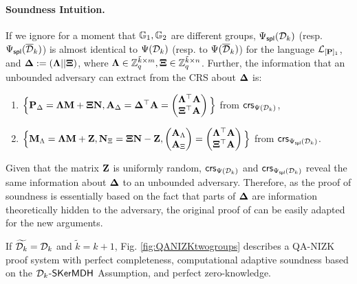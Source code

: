 \paragraph{Soundness Intuition.}   If we ignore for a moment that $\mathbb{G}_1, \mathbb{G}_2$ are different groups, ${\Psi_{\mathsf{spl}}(\mathcal{D}_k)}$ (resp. ${\Psi_\mathsf{spl}(\overline{\mathcal{D}}_k)}$) is almost identical to $\Psi({\mathcal{D}_k})$ (resp. to ${\Psi(\overline{\mathcal{D}}_k)}$) for the language $\mathcal{L}_{[\mathbf{{P}}]_1}$, and $\mathbf{{\Delta}}:=(\mathbf{{\Lambda}}||\mathbf{{\Xi}})$, where  $\mathbf{{\Lambda}} \in \mathbb{Z}_q^{\tilde{k} \times m},\mathbf{{\Xi}} \in \mathbb{Z}_q^{\tilde{k} \times n}$. Further, the information that an unbounded adversary can extract from the CRS about $\mathbf{{\Delta}}$ is:
 \begin{enumerate}
 \item $\Big\{\mathbf{{P}}_\Delta= \mathbf{{\Lambda}} \mathbf{{M}}+ \mathbf{{\Xi}}\mathbf{{N}}, \mathbf{{A}}_{\Delta} = \mathbf{{\Delta}}^{\top}\mathbf{{A}} =\begin{pmatrix} \mathbf{{\Lambda}}^{\top}\mathbf{{A}} \\ \mathbf{{\Xi}}^{\top}\mathbf{{A}} \end{pmatrix}\Big\}$ from $\mathsf{crs}_{\Psi({\mathcal{D}_k})}$, 
 \item $\Big\{ \mathbf{{M}}_\Lambda = \mathbf{{\Lambda}} \mathbf{{M}}+\mathbf{{Z}}, \mathbf{{N}}_\Xi = \mathbf{{\Xi}}\mathbf{{N}}-\mathbf{{Z}},  \begin{pmatrix}\mathbf{{A}}_\Lambda\\\mathbf{{A}}_\Xi\end{pmatrix} = \begin{pmatrix} \mathbf{{\Lambda}}^{\top}\mathbf{{A}} \\ \mathbf{{\Xi}}^{\top}\mathbf{{A}} \end{pmatrix} \Big\}$ from $\mathsf{crs}_{{\Psi_{\mathsf{spl}}(\mathcal{D}_k)}}$. 
 \end{enumerate}
Given that the matrix $\mathbf{{Z}}$ is uniformly random,  $\mathsf{crs}_{\Psi({\mathcal{D}_k})}$ and $\mathsf{crs}_{{\Psi_{\mathsf{spl}}(\mathcal{D}_k)}}$
reveal the same information about $\mathbf{{\Delta}}$ to an unbounded adversary. Therefore, as the proof of soundness is essentially based on the fact that parts of $\mathbf{{\Delta}}$ are information theoretically hidden to the adversary, the original proof of \cite{EC:KilWee15} can be easily adapted for the new arguments. 

\begin{theorem} If $\widetilde{\mathcal{D}_{k}}=\mathcal{D}_k$ and $\tilde{k}=k+1$,  Fig. \ref{fig:QANIZKtwogroups} describes a QA-NIZK
proof system with perfect completeness, computational adaptive soundness based on the  $\mathcal{D}_{k}$-$\mathsf{SKerMDH}$ Assumption, and perfect zero-knowledge. 
\label{theo:membtwogroups1}
\end{theorem}

